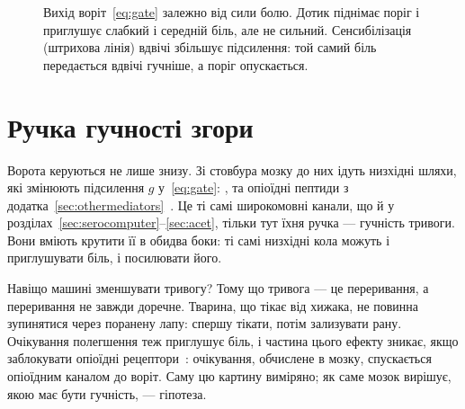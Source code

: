 \begin{figure}[t]
\centering
{}
\caption{Вихід воріт~\eqref{eq:gate} залежно від сили болю. Дотик піднімає поріг і приглушує слабкий і середній біль, але не сильний. Сенсибілізація (штрихова лінія) вдвічі збільшує підсилення: той самий біль передається вдвічі гучніше, а поріг опускається.}
\label{fig:gatecurves}
\end{figure}

\section{Ручка гучності згори}

Ворота керуються не лише знизу. Зі стовбура мозку до них ідуть низхідні шляхи, які змінюють підсилення $g$ у~\eqref{eq:gate}: ,  та опіоїдні пептиди з додатка~\ref{sec:othermediators}~\cite{Fields2004}. Це ті самі широкомовні канали, що й у розділах~\ref{sec:serocomputer}--\ref{sec:acet}, тільки тут їхня ручка --- гучність тривоги. Вони вміють крутити її в обидва боки: ті самі низхідні кола можуть і приглушувати біль, і посилювати його.

Навіщо машині зменшувати тривогу? Тому що тривога --- це переривання, а переривання не завжди доречне. Тварина, що тікає від хижака, не повинна зупинятися через поранену лапу: спершу тікати, потім зализувати рану. Очікування полегшення теж приглушує біль, і частина цього ефекту зникає, якщо заблокувати опіоїдні рецептори~\cite{Levine1978}: очікування, обчислене в мозку, спускається опіоїдним каналом до воріт. Саму цю картину виміряно; як саме мозок вирішує, якою має бути гучність, --- гіпотеза.

